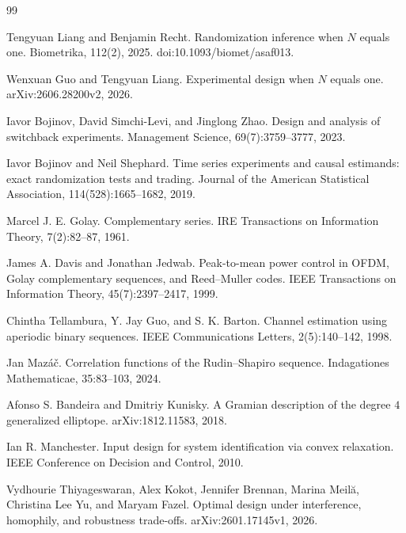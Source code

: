 \documentclass{article}
\begin{document}
\begin{thebibliography}{99}

   Tengyuan Liang and Benjamin Recht. Randomization inference when \(N\) equals one. Biometrika, 112(2), 2025. doi:10.1093/biomet/asaf013.

   Wenxuan Guo and Tengyuan Liang. Experimental design when \(N\) equals one. arXiv:2606.28200v2, 2026.

   Iavor Bojinov, David Simchi-Levi, and Jinglong Zhao. Design and analysis of switchback experiments. Management Science, 69(7):3759--3777, 2023.

   Iavor Bojinov and Neil Shephard. Time series experiments and causal estimands: exact randomization tests and trading. Journal of the American Statistical Association, 114(528):1665--1682, 2019.

   Marcel J. E. Golay. Complementary series. IRE Transactions on Information Theory, 7(2):82--87, 1961.

   James A. Davis and Jonathan Jedwab. Peak-to-mean power control in OFDM, Golay complementary sequences, and Reed--Muller codes. IEEE Transactions on Information Theory, 45(7):2397--2417, 1999.

   Chintha Tellambura, Y. Jay Guo, and S. K. Barton. Channel estimation using aperiodic binary sequences. IEEE Communications Letters, 2(5):140--142, 1998.

   Jan Mazáč. Correlation functions of the Rudin--Shapiro sequence. Indagationes Mathematicae, 35:83--103, 2024.

   Afonso S. Bandeira and Dmitriy Kunisky. A Gramian description of the degree \(4\) generalized elliptope. arXiv:1812.11583, 2018.

   Ian R. Manchester. Input design for system identification via convex relaxation. IEEE Conference on Decision and Control, 2010.

   Vydhourie Thiyageswaran, Alex Kokot, Jennifer Brennan, Marina Meilă, Christina Lee Yu, and Maryam Fazel. Optimal design under interference, homophily, and robustness trade-offs. arXiv:2601.17145v1, 2026.

\end{thebibliography}
\end{document}
